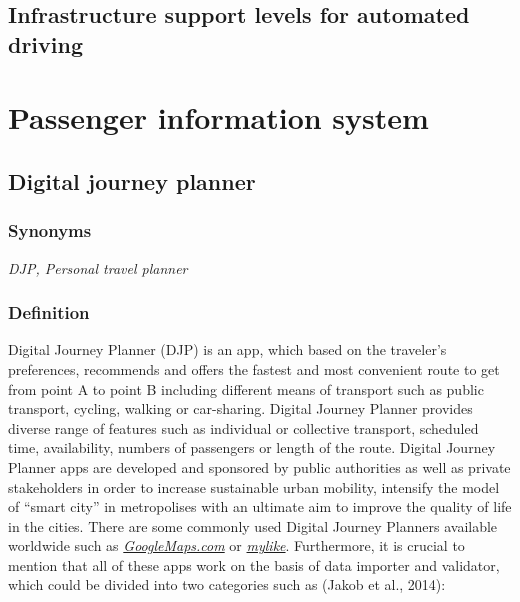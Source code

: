 \documentclass[
]{book}
\begin{document}
\hypertarget{infrast_support_level}{%
\section{Infrastructure support levels for automated driving}\label{infrast_support_level}}

\hypertarget{passenger}{%
\chapter{Passenger information system}\label{passenger}}

\hypertarget{djp}{%
\section{Digital journey planner}\label{djp}}

\hypertarget{synonyms-11}{%
\subsection*{Synonyms}\label{synonyms-11}}

\emph{DJP, Personal travel planner}

\hypertarget{definition-12}{%
\subsection*{Definition}\label{definition-12}}

Digital Journey Planner (DJP) is an app, which based on the traveler's preferences, recommends and offers the fastest and most convenient route to get from point A to point B including different means of transport such as public transport, cycling, walking or car-sharing. Digital Journey Planner provides diverse range of features such as individual or collective transport, scheduled time, availability, numbers of passengers or length of the route. Digital Journey Planner apps are developed and sponsored by public authorities as well as private stakeholders in order to increase sustainable urban mobility, intensify the model of ``smart city'' in metropolises with an ultimate aim to improve the quality of life in the cities.
There are some commonly used Digital Journey Planners available worldwide such as \href{https://www.google.com/maps}{\emph{GoogleMaps.com}} or \href{https://mylike.io/personal-travel-planner/}{\emph{mylike}}. Furthermore, it is crucial to mention that all of these apps work on the basis of data importer and validator, which could be divided into two categories such as (Jakob et al., 2014):
\end{document}
